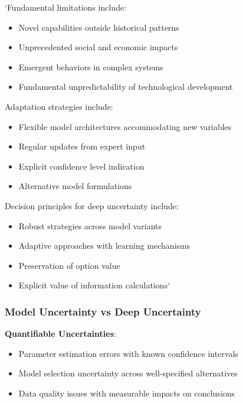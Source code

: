 \documentclass[
  11pt,
  letterpaper,
]{book}
\providecommand{\tightlist}{%
  \setlength{\itemsep}{0pt}\setlength{\parskip}{0pt}}
\begin{document}
`Fundamental limitations include:

\begin{itemize}
\tightlist
\item
  Novel capabilities outside historical patterns
\item
  Unprecedented social and economic impacts
\item
  Emergent behaviors in complex systems
\item
  Fundamental unpredictability of technological development
\end{itemize}

Adaptation strategies include:

\begin{itemize}
\tightlist
\item
  Flexible model architectures accommodating new variables
\item
  Regular updates from expert input
\item
  Explicit confidence level indication
\item
  Alternative model formulations
\end{itemize}

Decision principles for deep uncertainty include:

\begin{itemize}
\tightlist
\item
  Robust strategies across model variants
\item
  Adaptive approaches with learning mechanisms
\item
  Preservation of option value
\item
  Explicit value of information calculations`
\end{itemize}

\subsubsection{Model Uncertainty vs Deep
Uncertainty}\label{sec-model-vs-deep-uncertainty}

\textbf{Quantifiable Uncertainties}:

\begin{itemize}
\tightlist
\item
  Parameter estimation errors with known confidence intervals
\item
  Model selection uncertainty across well-specified alternatives
\item
  Data quality issues with measurable impacts on conclusions
\end{itemize}
\end{document}
